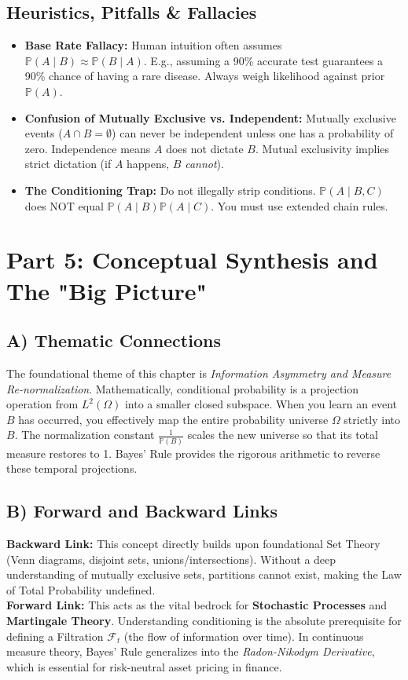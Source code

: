\documentclass[12pt]{article}
\begin{document}
\subsection{Heuristics, Pitfalls \& Fallacies}
\begin{itemize}
    \item \textbf{Base Rate Fallacy:} Human intuition often assumes $\mathbb{P}(A \mid B) \approx \mathbb{P}(B \mid A)$. E.g., assuming a 90\% accurate test guarantees a 90\% chance of having a rare disease. Always weigh likelihood against prior $\mathbb{P}(A)$.
    \item \textbf{Confusion of Mutually Exclusive vs. Independent:} Mutually exclusive events ($A \cap B = \emptyset$) can never be independent unless one has a probability of zero. Independence means $A$ does not dictate $B$. Mutual exclusivity implies strict dictation (if $A$ happens, $B$ \textit{cannot}).
    \item \textbf{The Conditioning Trap:} Do not illegally strip conditions. $\mathbb{P}(A \mid B, C)$ does NOT equal $\mathbb{P}(A \mid B) \mathbb{P}(A \mid C)$. You must use extended chain rules.
\end{itemize}

\newpage
\section{Part 5: Conceptual Synthesis and The "Big Picture"}

\subsection{A) Thematic Connections}
The foundational theme of this chapter is \textit{Information Asymmetry and Measure Re-normalization}. Mathematically, conditional probability is a projection operation from $L^2(\Omega)$ into a smaller closed subspace. When you learn an event $B$ has occurred, you effectively map the entire probability universe $\Omega$ strictly into $B$. The normalization constant $\frac{1}{\mathbb{P}(B)}$ scales the new universe so that its total measure restores to 1. Bayes' Rule provides the rigorous arithmetic to reverse these temporal projections.

\subsection{B) Forward and Backward Links}
\textbf{Backward Link:} This concept directly builds upon foundational Set Theory (Venn diagrams, disjoint sets, unions/intersections). Without a deep understanding of mutually exclusive sets, partitions cannot exist, making the Law of Total Probability undefined.
\\
\textbf{Forward Link:} This acts as the vital bedrock for \textbf{Stochastic Processes} and \textbf{Martingale Theory}. Understanding conditioning is the absolute prerequisite for defining a Filtration $\mathcal{F}_t$ (the flow of information over time). In continuous measure theory, Bayes' Rule generalizes into the \textit{Radon-Nikodym Derivative}, which is essential for risk-neutral asset pricing in finance.
\end{document}
